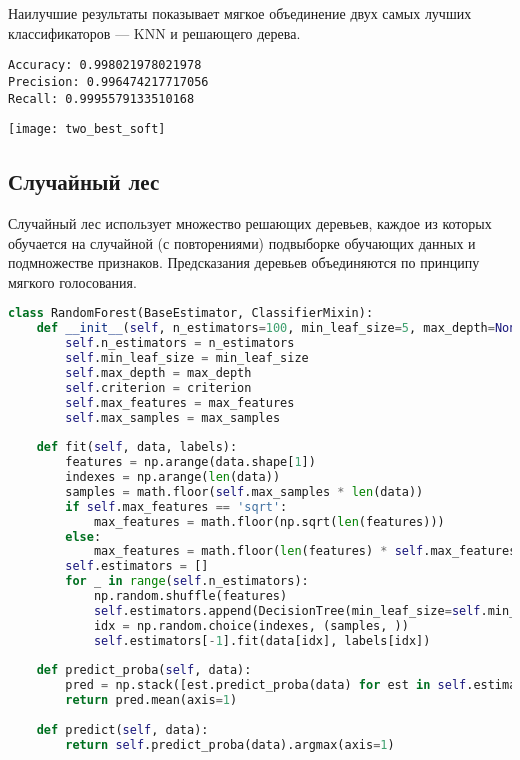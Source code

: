 Наилучшие результаты показывает мягкое объединение двух самых лучших классификаторов --- KNN и решающего дерева.
\begin{lstlisting}[frame=none, numbers=none]
Accuracy: 0.998021978021978
Precision: 0.996474217717056
Recall: 0.9995579133510168
\end{lstlisting}
\begin{center}
\texttt{[image: two\_best\_soft]}
\end{center}

\subsection*{Случайный лес}

Случайный лес использует множество решающих деревьев, каждое из которых обучается на случайной (с повторениями) подвыборке обучающих данных и подмножестве признаков. Предсказания деревьев объединяются по принципу мягкого голосования.

\begin{lstlisting}[language=python, keepspaces=true]
class RandomForest(BaseEstimator, ClassifierMixin):
    def __init__(self, n_estimators=100, min_leaf_size=5, max_depth=None, criterion=entropy, max_features='sqrt', max_samples=0.8):
        self.n_estimators = n_estimators
        self.min_leaf_size = min_leaf_size
        self.max_depth = max_depth
        self.criterion = criterion
        self.max_features = max_features
        self.max_samples = max_samples
        
    def fit(self, data, labels):
        features = np.arange(data.shape[1])
        indexes = np.arange(len(data))
        samples = math.floor(self.max_samples * len(data))
        if self.max_features == 'sqrt':
            max_features = math.floor(np.sqrt(len(features)))
        else:
            max_features = math.floor(len(features) * self.max_features)
        self.estimators = []
        for _ in range(self.n_estimators):
            np.random.shuffle(features)
            self.estimators.append(DecisionTree(min_leaf_size=self.min_leaf_size, max_depth=self.max_depth, criterion=self.criterion, features=features[:max_features]))
            idx = np.random.choice(indexes, (samples, ))
            self.estimators[-1].fit(data[idx], labels[idx])
        
    def predict_proba(self, data):
        pred = np.stack([est.predict_proba(data) for est in self.estimators], axis=1)
        return pred.mean(axis=1)
    
    def predict(self, data):
        return self.predict_proba(data).argmax(axis=1)
\end{lstlisting}

